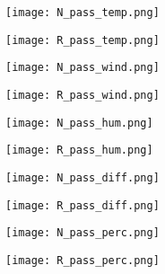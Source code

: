 \documentclass[12pt]{article}
\begin{document}
\begin{figure}[h!]
	\centering
	\begin{subfigure}[b]{0.4\linewidth}
		\texttt{[image: N\_pass\_temp.png]}
	\end{subfigure}
	\begin{subfigure}[b]{0.4\linewidth}
		\texttt{[image: R\_pass\_temp.png]}
	\end{subfigure}
\end{figure}

\begin{figure}[h!]
	\centering
	\begin{subfigure}[b]{0.4\linewidth}
		\texttt{[image: N\_pass\_wind.png]}
	\end{subfigure}
	\begin{subfigure}[b]{0.4\linewidth}
		\texttt{[image: R\_pass\_wind.png]}
	\end{subfigure}
\end{figure}

\begin{figure}[h!]
	\centering
	\begin{subfigure}[b]{0.4\linewidth}
		\texttt{[image: N\_pass\_hum.png]}
	\end{subfigure}
	\begin{subfigure}[b]{0.4\linewidth}
		\texttt{[image: R\_pass\_hum.png]}
	\end{subfigure}
\end{figure}

\begin{figure}[h!]
	\centering
	\begin{subfigure}[b]{0.4\linewidth}
		\texttt{[image: N\_pass\_diff.png]}
	\end{subfigure}
	\begin{subfigure}[b]{0.4\linewidth}
		\texttt{[image: R\_pass\_diff.png]}
	\end{subfigure}
\end{figure}

\begin{figure}[h!]
	\centering
	\begin{subfigure}[b]{0.4\linewidth}
		\texttt{[image: N\_pass\_perc.png]}
	\end{subfigure}
	\begin{subfigure}[b]{0.4\linewidth}
		\texttt{[image: R\_pass\_perc.png]}
	\end{subfigure}
\end{figure}
\end{document}
